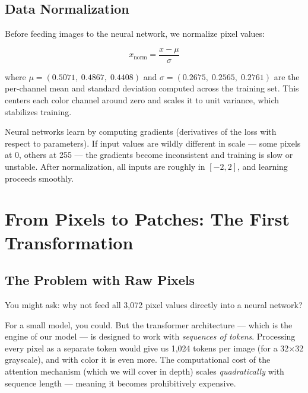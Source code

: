 \documentclass[12pt, a4paper]{report}
\begin{document}
\section{Data Normalization}

Before feeding images to the neural network, we normalize pixel values:

\begin{equation}
x_{\text{norm}} = \frac{x - \mu}{\sigma}
\end{equation}

where $\mu = (0.5071,\; 0.4867,\; 0.4408)$ and $\sigma = (0.2675,\; 0.2565,\; 0.2761)$ are the per-channel mean and standard deviation computed across the training set. This centers each color channel around zero and scales it to unit variance, which stabilizes training.

\begin{conceptbox}
Neural networks learn by computing gradients (derivatives of the loss with respect to parameters). If input values are wildly different in scale — some pixels at 0, others at 255 — the gradients become inconsistent and training is slow or unstable. After normalization, all inputs are roughly in $[-2, 2]$, and learning proceeds smoothly.
\end{conceptbox}

\chapter{From Pixels to Patches: The First Transformation}

\section{The Problem with Raw Pixels}

You might ask: why not feed all 3,072 pixel values directly into a neural network?

For a small model, you could. But the transformer architecture — which is the engine of our model — is designed to work with \emph{sequences of tokens}. Processing every pixel as a separate token would give us 1,024 tokens per image (for a 32×32 grayscale), and with color it is even more. The computational cost of the attention mechanism (which we will cover in depth) scales \emph{quadratically} with sequence length — meaning it becomes prohibitively expensive.
\end{document}
